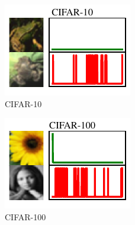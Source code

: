 \begin{figure}[t]
\vspace{-5pt}
\centering

\begin{subfigure}[b]{0.23\linewidth}
  \centering
  \includegraphics[width=\linewidth]{figs/sptd/cifar10_points.pdf}
  \caption{CIFAR-10}
\end{subfigure}
\hfill
\begin{subfigure}[b]{0.23\linewidth}
  \centering
  \includegraphics[width=\linewidth]{figs/sptd/cifar100_points.pdf}
  \caption{CIFAR-100}
\end{subfigure}
\hfill
\begin{subfigure}[b]{0.23\linewidth}
  \centering

\end{subfigure}
\end{figure}
